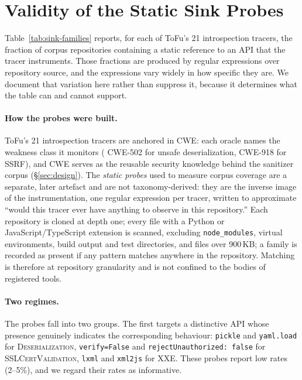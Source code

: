 
\section{Validity of the Static Sink Probes}
\label{app:probes}

Table~\ref{tab:sink-families} reports, for each of ToFu's 21 introspection
tracers, the fraction of corpus repositories containing a static reference to
an API that the tracer instruments. Those fractions are produced by regular
expressions over repository source, and the expressions vary widely in how
specific they are. We document that variation here rather than suppress it,
because it determines what the table can and cannot support.

\paragraph{How the probes were built.}
ToFu's 21 introspection tracers are anchored in CWE: each oracle names the
weakness class it monitors (\eg{} CWE-502 for unsafe deserialization, CWE-918
for SSRF), and CWE serves as the reusable security knowledge behind the
sanitizer corpus (\S\ref{sec:design}). The \emph{static probes} used to
measure corpus coverage are a separate, later artefact and are not
taxonomy-derived: they are the inverse image of the instrumentation, one
regular expression per tracer, written to approximate ``would this tracer ever
have anything to observe in this repository.'' Each repository is cloned at depth
one; every file with a Python or JavaScript/TypeScript extension is scanned,
excluding \texttt{node\_modules}, virtual environments, build output and test
directories, and files over 900\,KB; a family is recorded as present if any
pattern matches anywhere in the repository. Matching is therefore at
repository granularity and is not confined to the bodies of registered tools.

\paragraph{Two regimes.}
The probes fall into two groups. The first targets a distinctive API whose
presence genuinely indicates the corresponding behaviour: \texttt{pickle} and
\texttt{yaml.load} for \textsc{Deserialization}, \texttt{verify=False} and
\texttt{rejectUnauthorized: false} for \textsc{SSLCertValidation},
\texttt{lxml} and \texttt{xml2js} for \textsc{XXE}. These probes report low
rates (2--5\%), and we regard their rates as informative.


